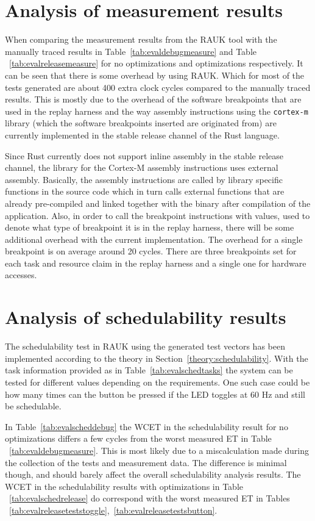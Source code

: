 \section{Analysis of measurement results}
\label{discussion:measurement}
When comparing the measurement results from the RAUK tool with the manually
traced results in Table~\ref{tab:evaldebugmeasure} and Table
~\ref{tab:evalreleasemeasure} for no optimizations and optimizations
respectively. It can be seen that there is some overhead by using RAUK\@. Which
for most of the tests generated are about 400 extra clock cycles compared to
the manually traced results. This is mostly due to the overhead of the software
breakpoints that are used in the replay harness and the way assembly
instructions using the \texttt{cortex-m} library (which the software
breakpoints inserted are originated from) are currently implemented in the
stable release channel of the Rust language.

Since Rust currently does not support inline assembly in the stable release
channel, the library for the Cortex-M assembly instructions uses external
assembly. Basically, the assembly instructions are called by library specific
functions in the source code which in turn calls external functions that are
already pre-compiled and linked together with the binary after compilation of
the application. Also, in order to call the breakpoint instructions with values,
used to denote what type of breakpoint it is in the replay harness, there will
be some additional overhead with the current implementation. The overhead for a
single breakpoint is on average around 20 cycles. There are three breakpoints
set for each task and resource claim in the replay harness and a single one for
hardware accesses.

\section{Analysis of schedulability results}
The schedulability test in RAUK using the generated test vectors has been
implemented according to the theory in Section~\ref{theory:schedulability}.
With the task information provided as in Table~\ref{tab:evalschedtasks} the
system can be tested for different values depending on the requirements. One
such case could be how many times can the button be pressed if the LED toggles
at 60 Hz and still be schedulable.

In Table~\ref{tab:evalscheddebug} the WCET in the schedulability result for no
optimizations differs a few cycles from the worst measured ET in Table
~\ref{tab:evaldebugmeasure}. This is most likely due to a miscalculation made
during the collection of the tests and measurement data. The difference is
minimal though, and should barely affect the overall schedulability analysis
results. The WCET in the schedulability results with optimizations in Table
~\ref{tab:evalschedrelease} do correspond with the worst measured ET in Tables
~\ref{tab:evalreleaseteststoggle},~\ref{tab:evalreleasetestsbutton}.

